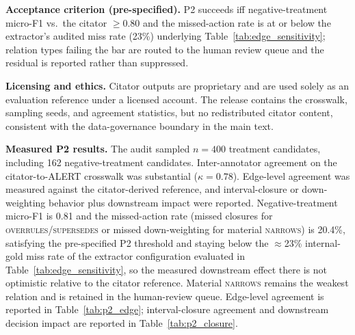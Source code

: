 \textbf{Acceptance criterion (pre-specified).} P2 succeeds iff negative-treatment micro-F1 vs.\ the citator $\ge\!0.80$ and the missed-action rate is at or below the extractor's audited miss rate (23\%) underlying Table~\ref{tab:edge_sensitivity}; relation types failing the bar are routed to the human review queue and the residual is reported rather than suppressed.

\textbf{Licensing and ethics.} Citator outputs are proprietary and are used solely as an evaluation reference under a licensed account. The release contains the crosswalk, sampling seeds, and agreement statistics, but no redistributed citator content, consistent with the data-governance boundary in the main text.

\textbf{Measured P2 results.} The audit sampled $n\!=\!400$ treatment candidates, including 162 negative-treatment candidates. Inter-annotator agreement on the citator-to-ALERT crosswalk was substantial ($\kappa=0.78$). Edge-level agreement was measured against the citator-derived reference, and interval-closure or down-weighting behavior plus downstream impact were reported. Negative-treatment micro-F1 is 0.81 and the missed-action rate (missed closures for \textsc{overrules}/\textsc{supersedes} or missed down-weighting for material \textsc{narrows}) is 20.4\%, satisfying the pre-specified P2 threshold and staying below the $\approx$23\% internal-gold miss rate of the extractor configuration evaluated in Table~\ref{tab:edge_sensitivity}, so the measured downstream effect there is not optimistic relative to the citator reference. Material \textsc{narrows} remains the weakest relation and is retained in the human-review queue. Edge-level agreement is reported in Table~\ref{tab:p2_edge}; interval-closure agreement and downstream decision impact are reported in Table~\ref{tab:p2_closure}.

\begin{table}[t]
\centering
\caption{Measured P2 edge agreement: ALERT treatment edges vs.\ the authoritative citator-derived reference. Micro-average is over the three negative-treatment relations.}
\label{tab:p2_edge}
\small
\setlength{\tabcolsep}{4pt}
\end{table}

